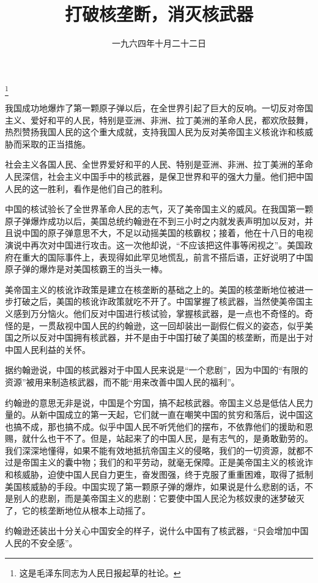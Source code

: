 
\title{打破核垄断，消灭核武器}
\date{一九六四年十月二十二日}
\thanks{这是毛泽东同志为人民日报起草的社论。}
\maketitle


我国成功地爆炸了第一颗原子弹以后，在全世界引起了巨大的反响。一切反对帝国主义、爱好和平的人民，特别是亚洲、非洲、拉丁美洲的革命人民，都欢欣鼓舞，热烈赞扬我国人民的这个重大成就，支持我国人民为反对美帝国主义核讹诈和核威胁而采取的正当措施。

社会主义各国人民、全世界爱好和平的人民、特别是亚洲、非洲、拉丁美洲的革命人民深信，社会主义中国手中的核武器，是保卫世界和平的强大力量。他们把中国人民的这一胜利，看作是他们自己的胜利。

中国的核试验长了全世界革命人民的志气，灭了美帝国主义的威风。在我国第一颗原子弹爆炸成功以后，美国总统约翰逊在不到三小时之内就发表声明加以反对，并且说中国的原子弹意思不大，不足以动摇美国的核霸权；接着，他在十八日的电视演说中再次对中国进行攻击。这一次他却说，“不应该把这件事等闲视之”。美国政府在重大的国际事件上，表现得如此罕见地慌乱，前言不搭后语，正好说明了中国原子弹的爆炸是对美国核霸王的当头一棒。

美帝国主义的核讹诈政策是建立在核垄断的基础之上的。美国的核垄断地位被进一步打破之后，美国的核讹诈政策就吃不开了。中国掌握了核武器，当然使美帝国主义感到万分恼火。他们反对中国进行核试验，掌握核武器，是一点也不奇怪的。奇怪的是，一贯敌视中国人民的约翰逊，这一回却装出一副假仁假义的姿态，似乎美国之所以反对中国拥有核武器，并不是由于中国打破了美国的核垄断，而是出于对中国人民利益的关怀。

据约翰逊说，中国的核武器对于中国人民来说是“一个悲剧”，因为中国的“有限的资源”被用来制造核武器，而不能“用来改善中国人民的福利”。

约翰逊的意思无非是说，中国是个穷国，搞不起核武器。帝国主义总是低估人民力量的。从新中国成立的第一天起，它们就一直在嘲笑中国的贫穷和落后，说中国这也搞不成，那也搞不成。似乎中国人民不听凭他们的摆布，不依靠他们的援助和恩赐，就什么也干不了。但是，站起来了的中国人民，是有志气的，是勇敢勤劳的。我们深深地懂得，如果不能有效地抵抗帝国主义的侵略，我们的一切资源，就都不过是帝国主义的囊中物；我们的和平劳动，就毫无保障。正是美帝国主义的核讹诈和核威胁，迫使中国人民自力更生，奋发图强，终于克服了重重困难，取得了抵制美国核威胁的手段。中国实现了第一颗原子弹的爆炸，如果说是什么悲剧的话，不是别人的悲剧，而是美帝国主义的悲剧：它要使中国人民沦为核奴隶的迷梦破灭了，它的核垄断地位从根本上动摇了。

约翰逊还装出十分关心中国安全的样子，说什么中国有了核武器，“只会增加中国人民的不安全感”。

